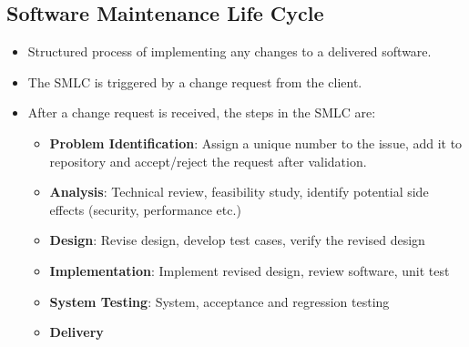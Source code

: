 \documentclass{article}
\begin{document}
\subsection{Software Maintenance Life Cycle}
\begin{itemize}
    \item Structured process of implementing any changes to a delivered software. 
    
    \item The SMLC is triggered by a change request from the client. 
    
    \item After a change request is received, the steps in the SMLC are:
    \begin{itemize}
        \item \textbf{Problem Identification}: Assign a unique number to the issue, add it to repository and accept/reject the request after validation.
        
        \item \textbf{Analysis}: Technical review, feasibility study, identify potential side effects (security, performance etc.)
        
        \item \textbf{Design}: Revise design, develop test cases, verify the revised design
        
        \item \textbf{Implementation}: Implement revised design, review software, unit test
        
        \item \textbf{System Testing}: System, acceptance and regression testing
        
        \item \textbf{Delivery} 
    \end{itemize}
\end{itemize}
\end{document}
